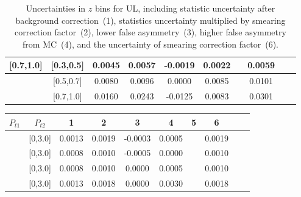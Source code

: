 \begin{table}[H]
\begin{tabular}{|c| c| c| c| c| c| c| c| c| c|}
[0.7,1.0]	&	[0.3,0.5]	&	0.0045	&	0.0057	&	-0.0019	&	0.0022	&		&	0.0059	\\ \hline
[0.7,1.0]	&	[0.5,0.7]	&	0.0080	&	0.0096	&	0.0000	&	0.0085	&		&	0.0101	\\ \hline
[0.7,1.0]	&	[0.7,1.0]	&	0.0160	&	0.0243	&	-0.0125	&	0.0083	&		&	0.0301	\\ \hline
\end{tabular}
\caption{Uncertainties in $z$ bins for UL, including statistic uncertainty after background correction~(1), statistics uncertainty multiplied by smearing correction factor~(2), lower false asymmetry~(3), higher false asymmetry from MC~(4),  and the uncertainty of smearing correction factor~(6).}
\label{tab:ulerrors_z}
\end{table}

\begin{table}[H]\scriptsize
\centering
\begin{tabular}{|c| c| c| c| c| c| c| c| c| c|}
\hline
$P_{t1}$ & $P_{t2}$ & 1 & 2 & 3 & 4& 5& 6 \\ \hline
[0,0.15]	&	[0,3.0]	&	0.0013	&	0.0019	&	-0.0003	&	0.0005	&		&	0.0019	\\ \hline
[0.15,0.3]	&	[0,3.0]	&	0.0008	&	0.0010	&	-0.0005	&	0.0000	&		&	0.0010	\\ \hline
[0.3,0.5]	&	[0,3.0]	&	0.0008	&	0.0010	&	0.0000	&	0.0005	&		&	0.0010	\\ \hline
[0.5,3.0]	&	[0,3.0]	&	0.0013	&	0.0018	&	0.0000	&	0.0030	&		&	0.0018	\\ \hline
															

\end{tabular}
\end{table}
